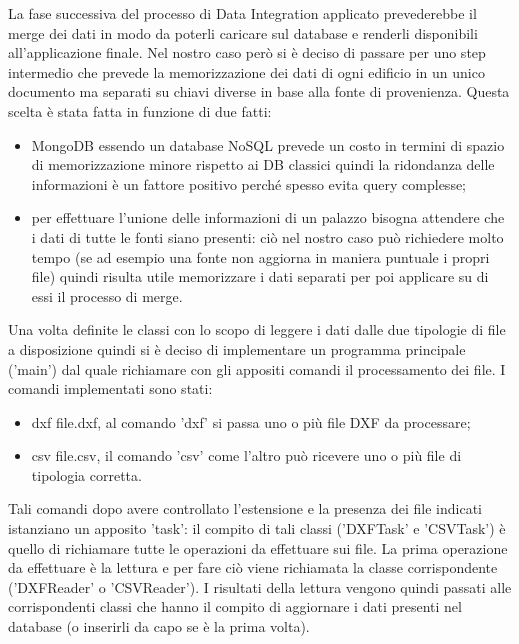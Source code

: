 \documentclass[12pt]{report}
\begin{document}
La fase successiva del processo di Data Integration applicato prevederebbe il merge dei dati in modo da poterli caricare sul database e renderli disponibili all'applicazione finale.
Nel nostro caso però si è deciso di passare per uno step intermedio che prevede la memorizzazione dei dati di ogni edificio in un unico documento ma separati su chiavi diverse in base alla fonte di provenienza.
Questa scelta è stata fatta in funzione di due fatti:
\begin{itemize}
\item MongoDB essendo un database NoSQL prevede un costo in termini di spazio di memorizzazione minore rispetto ai DB classici quindi la ridondanza delle informazioni è un fattore positivo perché spesso evita query complesse;
\item per effettuare l'unione delle informazioni di un palazzo bisogna attendere che i dati di tutte le fonti siano presenti: ciò nel nostro caso può richiedere molto tempo (se ad esempio una fonte non aggiorna in maniera puntuale i propri file) quindi risulta utile memorizzare i dati separati per poi applicare su di essi il processo di merge.     
\end{itemize}

\vspace{5mm} %

Una volta definite le classi con lo scopo di leggere i dati dalle due tipologie di file a disposizione quindi si è deciso di implementare un programma principale ('main') dal quale richiamare con gli appositi comandi il processamento dei file.
I comandi implementati sono stati:
\begin{itemize}
\item dxf file.dxf, al comando 'dxf' si passa uno o più file DXF da processare;
\item csv file.csv, il comando 'csv' come l'altro può ricevere uno o più file di tipologia corretta. 
\end{itemize}

Tali comandi dopo avere controllato l'estensione e la presenza dei file indicati istanziano un apposito 'task': il compito di tali classi ('DXFTask' e 'CSVTask') è quello di richiamare tutte le operazioni da effettuare sui file.
La prima operazione da effettuare è la lettura e per fare ciò viene richiamata la classe corrispondente ('DXFReader' o 'CSVReader'). 
I risultati della lettura vengono quindi passati alle corrispondenti classi che hanno il compito di aggiornare i dati presenti nel database (o inserirli da capo se è la prima volta). 
\end{document}
